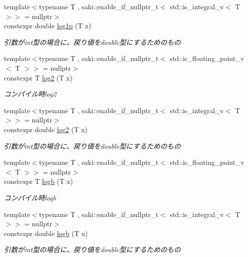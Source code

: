 \begin{DoxyCompactItemize}
{\footnotesize template$<$typename T , saki\+::enable\+\_\+if\+\_\+nullptr\+\_\+t$<$ std\+::is\+\_\+integral\+\_\+v$<$ T $>$$>$  = nullptr$>$ }\\constexpr double \mbox{\hyperlink{namespacesaki_aec755aa143bd9a0d03c5ebb2dc5dd3de}{log1p}} (T x)
\begin{DoxyCompactList}\small\item\em 引数がint型の場合に、戻り値をdouble型にするためのもの \end{DoxyCompactList}\item 
{\footnotesize template$<$typename T , saki\+::enable\+\_\+if\+\_\+nullptr\+\_\+t$<$ std\+::is\+\_\+floating\+\_\+point\+\_\+v$<$ T $>$$>$  = nullptr$>$ }\\constexpr T \mbox{\hyperlink{namespacesaki_ac184cde6c3531e01531219e081e25452}{log2}} (T x)
\begin{DoxyCompactList}\small\item\em コンパイル時log2 \end{DoxyCompactList}\item 
{\footnotesize template$<$typename T , saki\+::enable\+\_\+if\+\_\+nullptr\+\_\+t$<$ std\+::is\+\_\+integral\+\_\+v$<$ T $>$$>$  = nullptr$>$ }\\constexpr double \mbox{\hyperlink{namespacesaki_a8cb2f664389aab32abc797d9a60db4dc}{log2}} (T x)
\begin{DoxyCompactList}\small\item\em 引数がint型の場合に、戻り値をdouble型にするためのもの \end{DoxyCompactList}\item 
{\footnotesize template$<$typename T , saki\+::enable\+\_\+if\+\_\+nullptr\+\_\+t$<$ std\+::is\+\_\+floating\+\_\+point\+\_\+v$<$ T $>$$>$  = nullptr$>$ }\\constexpr T \mbox{\hyperlink{namespacesaki_ab7e81af48b13fbf88f135d296471bac1}{logb}} (T x)
\begin{DoxyCompactList}\small\item\em コンパイル時logb \end{DoxyCompactList}\item 
{\footnotesize template$<$typename T , saki\+::enable\+\_\+if\+\_\+nullptr\+\_\+t$<$ std\+::is\+\_\+integral\+\_\+v$<$ T $>$$>$  = nullptr$>$ }\\constexpr double \mbox{\hyperlink{namespacesaki_adf4ba562bb9897e98b75eb95027bfad5}{logb}} (T x)
\begin{DoxyCompactList}\small\item\em 引数がint型の場合に、戻り値をdouble型にするためのもの \end{DoxyCompactList}\item 

\end{DoxyCompactItemize}
